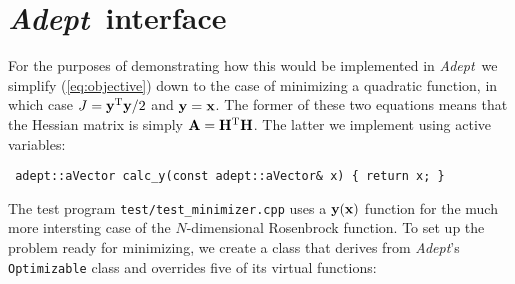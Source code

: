 \documentclass[a4,oneside]{book}
\def\codesize{\small}
\def\Adept{\emph{Adept}}
\def\code#1{{\codesize\texttt{#1}}}
\begin{document}
\section{\Adept\ interface}
\label{sec:minimizer_interface}
For the purposes of demonstrating how this would be implemented in
\Adept\ we simplify (\ref{eq:objective}) down to the case of
minimizing a quadratic function, in which case $J={\bf
  y}^\mathrm{T}{\bf y}/2$ and ${\bf y}={\bf x}$.  The former of these
two equations means that the Hessian matrix is simply ${\bf A}={\bf
  H}^\mathrm{T}{\bf H}$. The latter we implement using active
variables:
%
\begin{lstlisting}
 adept::aVector calc_y(const adept::aVector& x) { return x; }
\end{lstlisting}
%
The test program \code{test/test\_minimizer.cpp} uses a ${\bf y}({\bf
  x})$ function for the much more intersting case of the
$N$-dimensional Rosenbrock function.  To set up the problem ready for
minimizing, we create a class that derives from \Adept's
\code{Optimizable} class and overrides five of its virtual functions:
%
\end{document}
